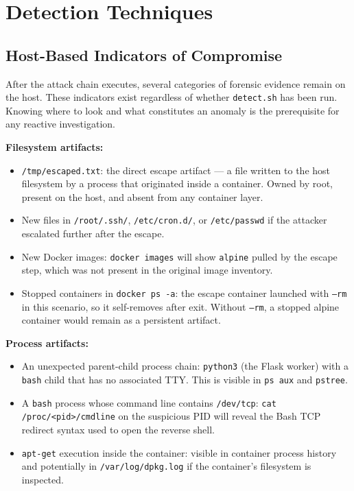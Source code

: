 \chapter{Detection Techniques}

\section{Host-Based Indicators of Compromise}

After the attack chain executes, several categories of forensic evidence remain on the host. These indicators exist regardless of whether \texttt{detect.sh} has been run. Knowing where to look and what constitutes an anomaly is the prerequisite for any reactive investigation.

\textbf{Filesystem artifacts:}
\begin{itemize}
    \item \texttt{/tmp/escaped.txt}: the direct escape artifact --- a file written to the host filesystem by a process that originated inside a container. Owned by root, present on the host, and absent from any container layer.
    \item New files in \texttt{/root/.ssh/}, \texttt{/etc/cron.d/}, or \texttt{/etc/passwd} if the attacker escalated further after the escape.
    \item New Docker images: \texttt{docker images} will show \texttt{alpine} pulled by the escape step, which was not present in the original image inventory.
    \item Stopped containers in \texttt{docker ps -a}: the escape container launched with \texttt{--rm} in this scenario, so it self-removes after exit. Without \texttt{--rm}, a stopped alpine container would remain as a persistent artifact.
\end{itemize}

\textbf{Process artifacts:}
\begin{itemize}
    \item An unexpected parent-child process chain: \texttt{python3} (the Flask worker) with a \texttt{bash} child that has no associated TTY. This is visible in \texttt{ps aux} and \texttt{pstree}.
    \item A \texttt{bash} process whose command line contains \texttt{/dev/tcp}: \texttt{cat /proc/<pid>/cmdline} on the suspicious PID will reveal the Bash TCP redirect syntax used to open the reverse shell.
    \item \texttt{apt-get} execution inside the container: visible in container process history and potentially in \texttt{/var/log/dpkg.log} if the container's filesystem is inspected.
\end{itemize}

